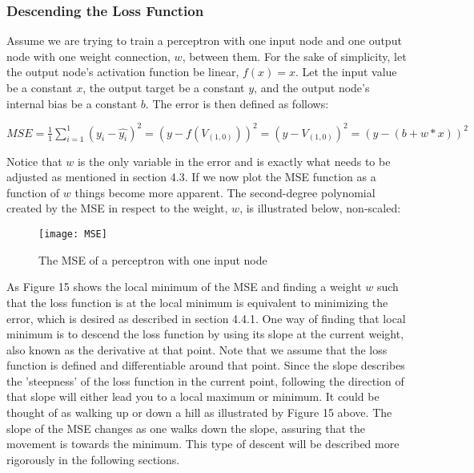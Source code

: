 \documentclass[titlepage]{article}
\begin{document}
\newpage

\subsubsection{Descending the Loss Function}

\vskip 0.2cm

Assume we are trying to train a perceptron with one input node and one output node with one weight connection, $w$, between them. For the sake of simplicity, let the output node's activation function be linear, $f(x) = x$. Let the input value be a constant $x$, the output target be a constant $y$, and the output node's internal bias be a constant $b$. The error is then defined as follows: 

\vskip 0.5cm

\centerline{$MSE = \frac{1}{1}\sum_{i=1}^{1}(y_{i} - \hat{y_{i}})^2 = (y - f(V_{(1, 0)}))^2 = (y - V_{(1, 0)})^2 = (y - (b + w * x))^2$}

\vskip 0.5cm

\noindent
Notice that $w$ is the only variable in the error and is exactly what needs to be adjusted as mentioned in section 4.3. If we now plot the MSE function as a function of $w$ things become more apparent. The second-degree polynomial created by the MSE in respect to the weight, $w$, is illustrated below, non-scaled:

\vskip 0.5cm

\begin{figure}[h]
    \center
    \texttt{[image: MSE]}
    \caption{The MSE of a perceptron with one input node}
\end{figure}

\vskip 0.2cm

\noindent
As Figure 15 shows the local minimum of the MSE and finding a weight $w$ such that the loss function is at the local minimum is equivalent to minimizing the error, which is desired as described in section 4.4.1. One way of finding that local minimum is to descend the loss function by using its slope at the current weight, also known as the derivative at that point. Note that we assume that the loss function is defined and differentiable around that point. Since the slope describes the 'steepness' of the loss function in the current point, following the direction of that slope will either lead you to a local maximum or minimum. It could be thought of as walking up or down a hill as illustrated by Figure 15 above. The slope of the MSE changes as one walks down the slope, assuring that the movement is towards the minimum. This type of descent will be described more rigorously in the following sections.
\end{document}
